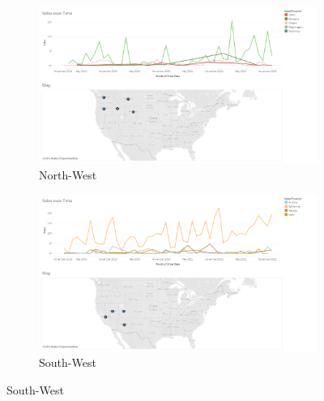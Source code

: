 \documentclass[openany]{article}
\begin{document}
\begin{figure}[h]
	\centering
	\begin{subfigure}{.8\textwidth}
		\centering
		\includegraphics[width=\linewidth]{Tableau/b_1}
		\caption{North-West}
	\end{subfigure}

	\begin{subfigure}{.8\textwidth}
		\centering
		\includegraphics[width=\linewidth]{Tableau/b_2}
		\caption{South-West}
		\label {sw}
	\end{subfigure}
\end{figure}
\end{document}
